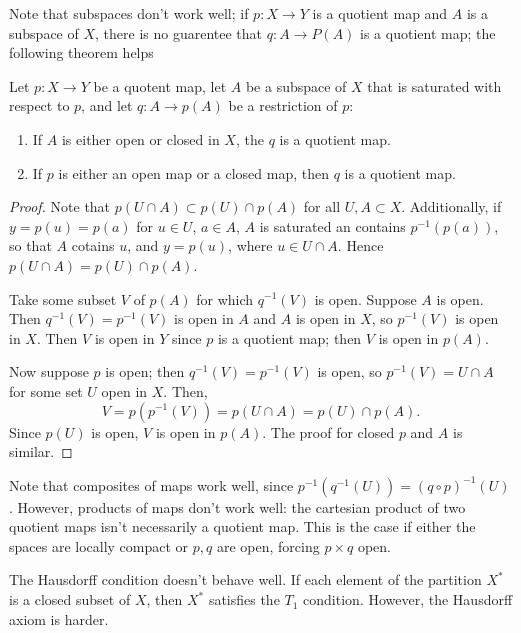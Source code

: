 \documentclass[10pt]{report}
\begin{document}
Note that subspaces don't work well; if $p:X \rightarrow Y$ is a quotient map and $A$ is a subspace of $X$, there is no guarentee that $q:A \rightarrow P(A)$ is a quotient map;
the following theorem helps
\begin{theorem}
  Let $p:X \rightarrow Y$ be a quotent map, let $A$ be a subspace of $X$ that is saturated with respect to $p$, and let $q:A \rightarrow p(A)$ be a restriction of $p$:
  \begin{enumerate}[label={(\arabic*)}]
    \item If $A$ is either open or closed in $X$, the $q$ is a quotient map.
    \item If $p$ is either an open map or a closed map, then $q$ is a quotient map.
  \end{enumerate}
\end{theorem}
\begin{proof}
  Note that $p(U \cap A) \subset p(U) \cap p(A)$ for all $U,A \subset X$.
  Additionally, if $y = p(u) = p(a)$ for $u \in U$, $a \in A$, $A$ is saturated an contains $p^{-1}(p(a))$, so that $A$ cotains $u$, and $y = p(u)$, where $u \in U \cap A$.
  Hence $p(U \cap A) = p(U) \cap p(A)$.

  Take some subset $V$ of $p(A)$ for which $q^{-1}(V)$ is open.
  Suppose $A$ is open.
  Then $q^{-1}(V) = p^{-1}(V)$ is open in $A$ and $A$ is open in $X$, so $p^{-1}(V)$ is open in $X$.
  Then $V$ is open in $Y$ since $p$ is a quotient map; then $V$ is open in $p(A)$.

  Now suppose $p$ is open;
  then $q^{-1}(V) = p^{-1}(V)$ is open, so $p^{-1}(V) = U \cap A$ for some set $U$ open in $X$.
  Then,
  \[
    V = p(p^{-1}(V)) = p(U \cap A) = p(U) \cap p(A).
  \]
  Since $p(U)$ is open, $V$ is open in $p(A)$.
  The proof for closed $p$ and $A$ is similar.
\end{proof}

Note that composites of maps work well, since $p^{-1}(q^{-1}(U)) = (q \circ p)^{-1}(U)$.
However, products of maps don't work well:
the cartesian product of two quotient maps isn't necessarily a quotient map.
This is the case if either the spaces are locally compact or $p,q$ are open, forcing $p \times q$ open.

The Hausdorff condition doesn't behave well.
If each element of the partition $X^*$ is a closed subset of $X$, then $X^*$ satisfies the $T_1$ condition.
However, the Hausdorff axiom is harder.
\end{document}
